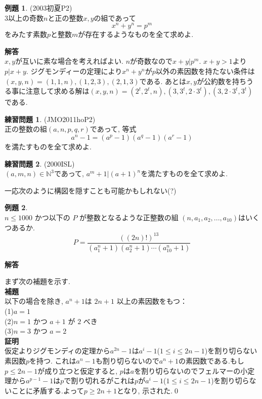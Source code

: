 \documentclass{ltjsarticle}
\theoremstyle{definition}
\newtheorem{prob}{練習問題}
\newtheorem{expr}{例題}
\begin{document}
\begin{expr}(2003初夏P2)\\
$3$以上の奇数$n$と正の整数$x,y$の組であって
$$x^n+y^n=p^m$$をみたす素数$p$と整数$m$が存在するようなものを全て求めよ.
\end{expr}

\textbf{解答}\\
$x,y$が互いに素な場合を考えればよい. $n$が奇数なので$x+y|p^m$. $x+y>1$より$p|x+y$. ジグモンディーの定理により$x^n+y^n$が$p$以外の素因数を持たない条件は$(x,y,n)=(1,1,n),(1,2,3),(2,1,3)$である. あとは$x,y$が公約数を持ちうる事に注意して求める解は$(x,y,n)=(2^t,2^t,n),(3,3^t,2\cdot3^t),(3,2\cdot3^t,3^t)$である.\\

\begin{prob}(JMO2011hoP2)\\
正の整数の組$(a,n,p,q,r)$であって, 等式$$a^n-1=(a^p-1)(a^q-1)(a^r-1)$$を満たすものを全て求めよ.
\end{prob}

\begin{prob}(2000ISL)\\
$(a,m,n)\in \mathbb N^3$であって, $a^m+1|(a+1)^n$を満たすものを全て求めよ.
\end{prob}

一応次のように構図を隠すことも可能かもしれない(?)

\begin{expr}\ \\
$n\leq1000$ かつ以下の $P$ が整数となるような正整数の組 $(n,a_1,a_2,...,a_{10})$はいくつあるか.
$$P=\frac{((2n)!)^{13}}{(a_1^n+1)(a_2^n+1)\cdots(a_{10}^n+1)}$$
\end{expr}
\textbf{解答}

まず次の補題を示す.\\
\textbf{補題}\\
以下の場合を除き, $a^n+1$は $2n+1$ 以上の素因数をもつ：\\
(1)$a=1$\\
(2)$n=1$ かつ $a+1$ が $2$ べき\\
(3)$n=3$ かつ $a=2$\\
\textbf{証明}\\
仮定よりジグモンディの定理から$a^{2n}-1$は$a^i-1$($1\leq i\leq 2n-1$)を割り切らない素因数$p$を持つ. これは$a^n-1$も割り切らないので$a^n+1$の素因数である.もし$p\leq 2n-1$が成り立つと仮定すると, $p$は$a$を割り切らないのでフェルマーの小定理から$a^{p-1}-1$は$p$で割り切れるがこれは$p$が$a^i-1$($1\leq i\leq 2n-1$)を割り切らないことに矛盾する.よって$p\geq 2n+1$となり, 示された.\qed\\
\end{document}

